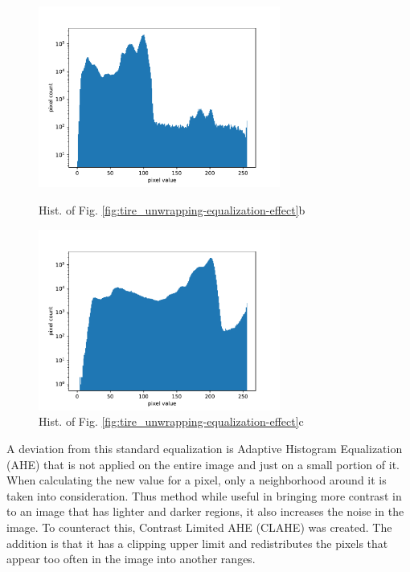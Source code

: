 \begin{figure}
    \centering
    \begin{minipage}[c]{0.50\linewidth}
        \centering
        \includegraphics[width=7.95cm, keepaspectratio]{img/algos/tire_unwrapping-histogram_effect-hist_b.pdf}
        \caption{Hist. of Fig. \ref{fig:tire_unwrapping-equalization-effect}b}
        \label{fig:tire_unwrapping-hist_of_equalization_effect_b}
    \end{minipage}\hfill
    \begin{minipage}[c]{0.50\linewidth}
        \centering
        \includegraphics[width=7.95cm, keepaspectratio]{img/algos/tire_unwrapping-histogram_effect-hist_c.pdf}
        \caption{Hist. of Fig. \ref{fig:tire_unwrapping-equalization-effect}c}
        \label{fig:tire_unwrapping-hist_of_equalization_effect_c}
    \end{minipage}\hfill
\end{figure}

A deviation from this standard equalization is Adaptive Histogram Equalization (AHE) that is not applied on the entire image and just on a small portion of it. When calculating the new value for a pixel, only a neighborhood around it is taken into consideration. Thus method while useful in bringing more contrast in to an image that has lighter and darker regions, it also increases the noise in the image. To counteract this, Contrast Limited AHE (CLAHE) was created. The addition is that it has a clipping upper limit and redistributes the pixels that appear too often in the image into another ranges.

